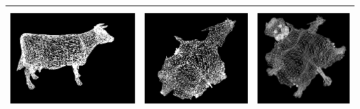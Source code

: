 \documentclass[12pt]{article}
\begin{document}
\begin{table}[htb]
\begin{center}
\begin{tabular}{|c|c|c|}
\includegraphics[height=1.5in]{20.png}&\includegraphics[height=1.5in]{21.png}&\includegraphics[height=1.5in]{22.png}\\\hline

\end{tabular}
\end{center}
\end{table}
\end{document}

